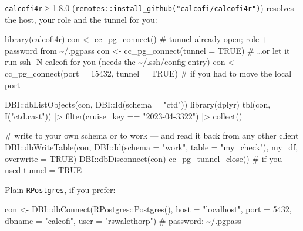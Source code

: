 \documentclass[
  letterpaper,
  DIV=11,
  numbers=noendperiod]{scrreprt}
\newenvironment{Shaded}{\begin{snugshade}}{\end{snugshade}}
\newcommand{\AttributeTok}[1]{\textcolor[rgb]{0.40,0.45,0.13}{#1}}
\newcommand{\CommentTok}[1]{\textcolor[rgb]{0.37,0.37,0.37}{#1}}
\newcommand{\ConstantTok}[1]{\textcolor[rgb]{0.56,0.35,0.01}{#1}}
\newcommand{\DecValTok}[1]{\textcolor[rgb]{0.68,0.00,0.00}{#1}}
\newcommand{\FunctionTok}[1]{\textcolor[rgb]{0.28,0.35,0.67}{#1}}
\newcommand{\NormalTok}[1]{\textcolor[rgb]{0.00,0.23,0.31}{#1}}
\newcommand{\OtherTok}[1]{\textcolor[rgb]{0.00,0.23,0.31}{#1}}
\newcommand{\SpecialCharTok}[1]{\textcolor[rgb]{0.37,0.37,0.37}{#1}}
\newcommand{\StringTok}[1]{\textcolor[rgb]{0.13,0.47,0.30}{#1}}
\begin{document}
\texttt{calcofi4r} ≥ 1.8.0
(\texttt{remotes::install\_github("calcofi/calcofi4r")}) resolves the
host, your role and the tunnel for you:

\begin{Shaded}
\begin{Highlighting}[]
\FunctionTok{library}\NormalTok{(calcofi4r)}
\NormalTok{con }\OtherTok{\textless{}{-}} \FunctionTok{cc\_pg\_connect}\NormalTok{()                       }\CommentTok{\# tunnel already open; role + password from \textasciitilde{}/.pgpass}
\NormalTok{con }\OtherTok{\textless{}{-}} \FunctionTok{cc\_pg\_connect}\NormalTok{(}\AttributeTok{tunnel =} \ConstantTok{TRUE}\NormalTok{)          }\CommentTok{\# …or let it run \textasciigrave{}ssh {-}N calcofi\textasciigrave{} for you (needs the \textasciitilde{}/.ssh/config entry)}
\NormalTok{con }\OtherTok{\textless{}{-}} \FunctionTok{cc\_pg\_connect}\NormalTok{(}\AttributeTok{port =} \DecValTok{15432}\NormalTok{, }\AttributeTok{tunnel =} \ConstantTok{TRUE}\NormalTok{)   }\CommentTok{\# if you had to move the local port}

\NormalTok{DBI}\SpecialCharTok{::}\FunctionTok{dbListObjects}\NormalTok{(con, DBI}\SpecialCharTok{::}\FunctionTok{Id}\NormalTok{(}\AttributeTok{schema =} \StringTok{"ctd"}\NormalTok{))}
\FunctionTok{library}\NormalTok{(dplyr)}
\FunctionTok{tbl}\NormalTok{(con, }\FunctionTok{I}\NormalTok{(}\StringTok{"ctd.cast"}\NormalTok{)) }\SpecialCharTok{|\textgreater{}} \FunctionTok{filter}\NormalTok{(cruise\_key }\SpecialCharTok{==} \StringTok{"2023{-}04{-}3322"}\NormalTok{) }\SpecialCharTok{|\textgreater{}} \FunctionTok{collect}\NormalTok{()}

\CommentTok{\# write to your own schema or to work — and read it back from any other client}
\NormalTok{DBI}\SpecialCharTok{::}\FunctionTok{dbWriteTable}\NormalTok{(con, DBI}\SpecialCharTok{::}\FunctionTok{Id}\NormalTok{(}\AttributeTok{schema =} \StringTok{"work"}\NormalTok{, }\AttributeTok{table =} \StringTok{"my\_check"}\NormalTok{), my\_df, }\AttributeTok{overwrite =} \ConstantTok{TRUE}\NormalTok{)}
\NormalTok{DBI}\SpecialCharTok{::}\FunctionTok{dbDisconnect}\NormalTok{(con)}
\FunctionTok{cc\_pg\_tunnel\_close}\NormalTok{()                          }\CommentTok{\# if you used tunnel = TRUE}
\end{Highlighting}
\end{Shaded}

Plain \texttt{RPostgres}, if you prefer:

\begin{Shaded}
\begin{Highlighting}[]
\NormalTok{con }\OtherTok{\textless{}{-}}\NormalTok{ DBI}\SpecialCharTok{::}\FunctionTok{dbConnect}\NormalTok{(RPostgres}\SpecialCharTok{::}\FunctionTok{Postgres}\NormalTok{(),}
  \AttributeTok{host =} \StringTok{"localhost"}\NormalTok{, }\AttributeTok{port =} \DecValTok{5432}\NormalTok{, }\AttributeTok{dbname =} \StringTok{"calcofi"}\NormalTok{, }\AttributeTok{user =} \StringTok{"rswalethorp"}\NormalTok{)  }\CommentTok{\# password: \textasciitilde{}/.pgpass}
\end{Highlighting}
\end{Shaded}
\end{document}
